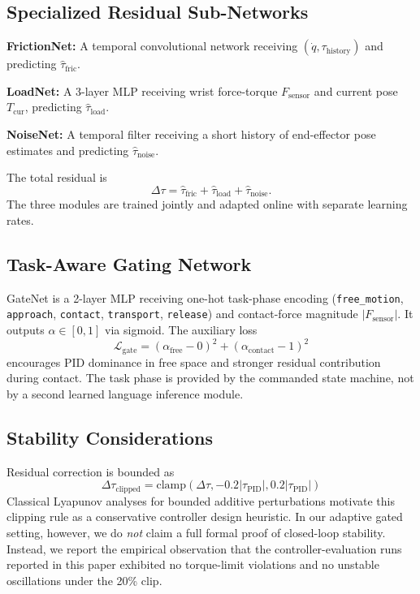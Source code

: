 \documentclass[12pt]{article}
\begin{document}
\subsection{Specialized Residual Sub-Networks}

\textbf{FrictionNet:} A temporal convolutional network receiving $(\dot{q}, \tau_{\mathrm{history}})$ and predicting $\hat{\tau}_{\mathrm{fric}}$.

\textbf{LoadNet:} A 3-layer MLP receiving wrist force-torque $F_{\mathrm{sensor}}$ and current pose $T_{\mathrm{cur}}$, predicting $\hat{\tau}_{\mathrm{load}}$.

\textbf{NoiseNet:} A temporal filter receiving a short history of end-effector pose estimates and predicting $\hat{\tau}_{\mathrm{noise}}$.

The total residual is
\[
\Delta\tau =
\hat{\tau}_{\mathrm{fric}} +
\hat{\tau}_{\mathrm{load}} +
\hat{\tau}_{\mathrm{noise}}.
\]
The three modules are trained jointly and adapted online with separate learning rates.

\subsection{Task-Aware Gating Network}

GateNet is a 2-layer MLP receiving one-hot task-phase encoding (\texttt{free\_motion}, \texttt{approach}, \texttt{contact}, \texttt{transport}, \texttt{release}) and contact-force magnitude $|F_{\mathrm{sensor}}|$. It outputs $\alpha \in [0,1]$ via sigmoid. The auxiliary loss
\[
\mathcal{L}_{\mathrm{gate}} =
(\alpha_{\mathrm{free}} - 0)^2 +
(\alpha_{\mathrm{contact}} - 1)^2
\]
encourages PID dominance in free space and stronger residual contribution during contact. The task phase is provided by the commanded state machine, not by a second learned language inference module.

\subsection{Stability Considerations}

Residual correction is bounded as
\[
\Delta\tau_{\mathrm{clipped}} =
\mathrm{clamp}(\Delta\tau, -0.2|\tau_{\mathrm{PID}}|, 0.2|\tau_{\mathrm{PID}}|)
\]
Classical Lyapunov analyses for bounded additive perturbations motivate this clipping rule as a conservative controller design heuristic. In our adaptive gated setting, however, we do \emph{not} claim a full formal proof of closed-loop stability. Instead, we report the empirical observation that the controller-evaluation runs reported in this paper exhibited no torque-limit violations and no unstable oscillations under the 20\% clip.
\end{document}
